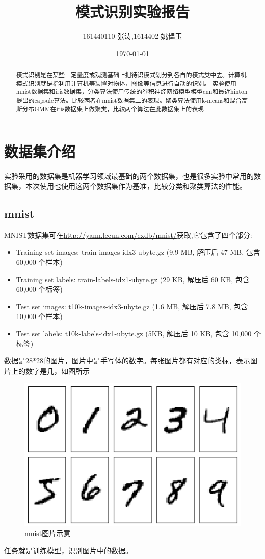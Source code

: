 \documentclass{article}
\title{\textbf{\zihao{2}模式识别实验报告\\ }}
\author{161440110 张涛,1614402 姚韫玉}
\date{\today}
\begin{document}

\maketitle
\begin{abstract}
模式识别是在某些一定量度或观测基础上把待识模式划分到各自的模式类中去。计算机模式识别就是指利用计算机等装置对物体，图像等信息进行自动的识别。
实验使用mnist数据集和iris数据集，分类算法使用传统的卷积神经网络模型模型cnn和最近hinton提出的capsule算法。比较两者在mnist数据集上的表现。聚类算法使用k-means和混合高斯分布GMM在iris数据集上做聚类，比较两个算法在此数据集上的表现
\end{abstract}
\section{数据集介绍}
实验采用的数据集是机器学习领域最基础的两个数据集，也是很多实验中常用的数据集，本次使用也使用这两个数据集作为基准，比较分类和聚类算法的性能。
\subsection{mnist\cite{mnist}}
MNIST数据集可在\url{http://yann.lecun.com/exdb/mnist/}获取,它包含了四个部分:
\begin{itemize}
	\item Training set images: train-images-idx3-ubyte.gz (9.9 MB, 解压后 47 MB, 包含 60,000 个样本)
    \item Training set labels: train-labels-idx1-ubyte.gz (29 KB, 解压后 60 KB, 包含 60,000 个标签)
    \item Test set images: t10k-images-idx3-ubyte.gz (1.6 MB, 解压后 7.8 MB, 包含 10,000 个样本)
    \item Test set labels: t10k-labels-idx1-ubyte.gz (5KB, 解压后 10 KB, 包含 10,000 个标签)
\end{itemize}

数据是28*28的图片，图片中是手写体的数字。每张图片都有对应的类标，表示图片上的数字是几，如图所示
\begin{figure}[htbp]
\centering\includegraphics[scale=0.6]{mnist}
\caption{mnist图片示意}\label{fig:1}
\end{figure}
任务就是训练模型，识别图片中的数据。
\end{document}
